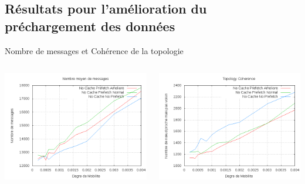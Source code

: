 \documentclass{beamer}
\begin{document}
  \subsection{Résultats pour l'amélioration du préchargement des données}
  \begin{frame}
	\begin{center}
	Nombre de messages et Cohérence de la topologie
	\end{center}
	\begin{columns}
         \begin{column}{5cm}
          \includegraphics[scale=0.25]{./Ressources/Images/Courbes_Final_Rapport/Nombre_Messages_Prefetchs.png}\\
         \end{column}
         \begin{column}{5cm}
          \includegraphics[scale=0.25]{./Ressources/Images/Courbes_Final_Rapport/Topology_Coherence_Prefetchs.png}\\
         \end{column}
        \end{columns}
  \end{frame}
	
\end{document}
